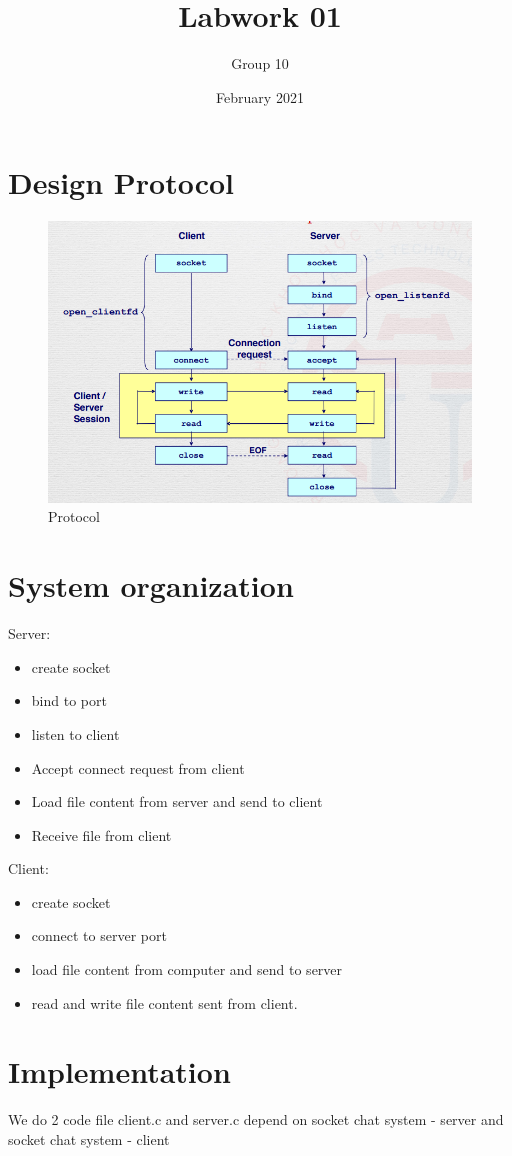 \documentclass{article}
\title{Labwork 01}
\author{Group 10}
\date{February 2021}
\begin{document}
\maketitle
\section{Design Protocol}
\begin{figure}[ht]
\centering
\includegraphics[scale=0.35]{protocol.PNG}
\caption{Protocol}
\end{figure}

\section{System organization}
Server:
\begin{itemize}
\item create socket
\item bind to port
\item listen to client
\item Accept connect request from client
\item Load file content from server and send to client
\item Receive file from client
    
\end{itemize}
Client:
\begin{itemize}
\item create socket
\item connect to server port
\item load file content from computer and send to server
\item read and write file content sent from client.
\end{itemize}
\section{Implementation}
We do 2 code file client.c and server.c depend on socket chat system - server and socket chat system - client 
\end{document}
